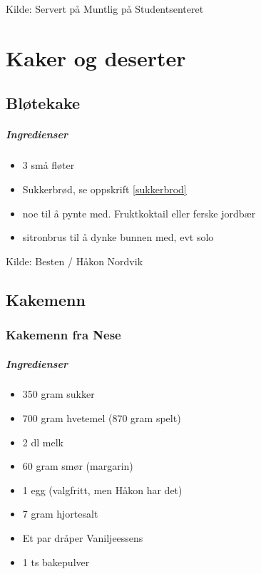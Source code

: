 \documentclass[12pt,a4paper]{book}
\begin{document}
{Kilde: Servert på Muntlig på Studentsenteret
\clearpage{}
 
\chapter{Kaker og deserter}
\clearpage{}\section{﻿Bløtekake}


\paragraph{Ingredienser}
\begin{itemize}[noitemsep]
	\item 3 små fløter
	\item Sukkerbrød, se oppskrift \ref{sukkerbrod}
	\item noe til å pynte med. Fruktkoktail eller ferske jordbær
	\item sitronbrus til å dynke bunnen med, evt solo
\end{itemize}


Kilde: Besten / Håkon Nordvik
\clearpage{}
\clearpage{}\section{﻿Kakemenn}

\subsection{Kakemenn fra Nese}

\paragraph{Ingredienser}
\begin{itemize}[noitemsep]
	\item 350 gram sukker
	\item 700 gram hvetemel (870 gram spelt)
	\item 2 dl melk
	\item 60 gram smør (margarin)
	\item 1 egg (valgfritt, men Håkon har det)
	\item 7 gram hjortesalt
	\item Et par dråper Vaniljeessens
	\item 1 ts bakepulver
\end{itemize}

}
\end{document}
